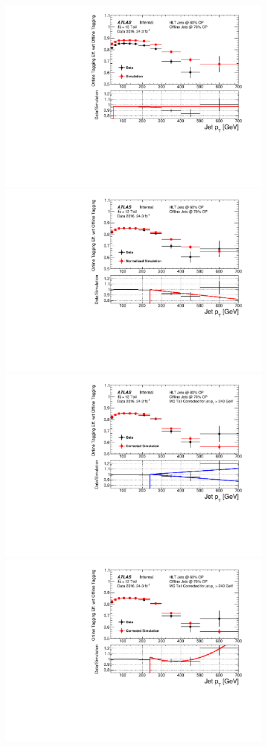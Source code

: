 \begin{figure}[!ht]
\begin{center}
\captionsetup[subfigure]{aboveskip=0pt,justification=centering}
   {\includegraphics[width=0.49\linewidth, angle=0]{figs/Trigger/Full_GRL_bslt2mm_effFit_jetPt.pdf} }
    \hspace{-0.5cm}
   {\includegraphics[width=0.49\linewidth, angle=0]{figs/Trigger/Full_GRL_bslt2mm_effNormFit_jetPt.pdf}} \\
   {\includegraphics[width=0.49\linewidth, angle=0]{figs/Trigger/Full_GRL_bslt2mm_effCorrShapeErr_jetPt.pdf}}
    \hspace{-0.5cm}
   {\includegraphics[width=0.49\linewidth, angle=0]{figs/Trigger/Full_GRL_bslt2mm_effCorrFitQuad_jetPt.pdf}}

\end{center}
\end{figure}
